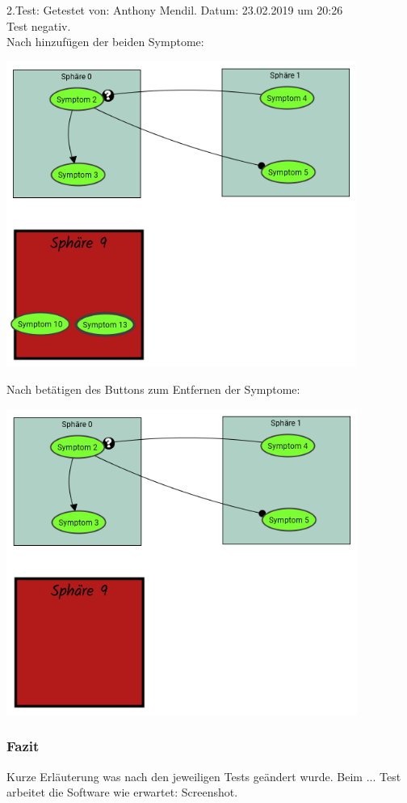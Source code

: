 \documentclass{scrartcl}
\begin{document}
2.Test: Getestet von: Anthony Mendil. Datum: 23.02.2019 um 20:26 \\
Test negativ. \\
Nach hinzufügen der beiden Symptome: 
\begin{center}
\includegraphics[height=10cm]{2_22vorher.PNG}
\end{center}
Nach betätigen des Buttons zum Entfernen der Symptome: 
\begin{center}
\includegraphics[height=10cm]{2_22.PNG}
\end{center}
\subsubsection{Fazit}
Kurze Erläuterung was nach den jeweiligen Tests geändert wurde. Beim ... Test arbeitet die Software wie erwartet: Screenshot. 
\end{document}
